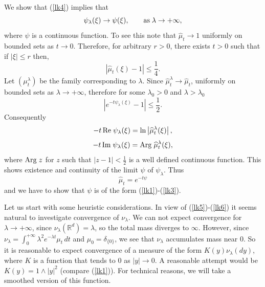 \documentclass[preprint]{imsart}
\def\R{\mathbb R}
\begin{document}
{\noindent We show that (\ref{lk4}) implies that
\begin{equation}\label{lk6}
\psi_\lambda (\xi)\to \psi(\xi),\qquad
{\rm as}\; \lambda\to +\infty,
\end{equation}
where $\psi$ is a continuous function. To see this note
that $\widehat{\mu}_t\to 1$ uniformly on bounded sets
as $t\to 0$. Therefore, for arbitrary $r>0$, there
exists $t>0$ such that if $|\xi|\leq r$ then,
$$
\left| \widehat{\mu}_t(\xi)-1\right|
\leq \frac{1}{4}.
$$
Let $(\mu_t^\lambda)$ be the family corresponding to
$\lambda$. Since
$\widehat{\mu}_t^\lambda\to\widehat{\mu}_t$, uniformly
on bounded sets as $\lambda\to +\infty$,  therefore for
some $\lambda_0>0$ and $\lambda >\lambda_0$
$$
\left| e^{-t\psi_\lambda(\xi)}-1\right|
\leq \frac{1}{2}.
$$
Consequently
$$
-t \, {\rm Re\;}\psi_\lambda(\xi)=\ln
\left|\widehat{\mu}_t^\lambda(\xi)\right|,
$$
$$
-t\,  {\rm Im\;}\psi_\lambda(\xi)=
{\rm Arg\;}\widehat{\mu}_t^\lambda(\xi) ,
$$
where ${\rm Arg\;}z$ for $z$ such that
$|z-1|<\frac{1}{2}$ is a well defined continuous
function. This shows existence and continuity of the
limit $\psi$ of $\psi_\lambda$. Thus
$$
\widehat{\mu}_t=e^{-t\psi}
$$
and we have to show that $\psi$ is of the form
(\ref{lk1})-(\ref{lk3}).

\noindent Let us start with some heuristic considerations. In
view of (\ref{lk5})-(\ref{lk6}) it seems natural to
investigate convergence of $\nu_\lambda$.
We can not expect convergence for $\lambda\to +\infty$,
since $\nu_\lambda (\R^d)=\lambda$, so the
total mass diverges to $\infty$. However, since
$\nu_\lambda =
\int_0^{+\infty}\lambda^2 e^{-\lambda t}\mu_t\, dt$
and $\mu_0=\delta_{\{0\}}$, we see that
$\nu_\lambda $ accumulates mass near $0$.
So it is reasonable to expect convergence of a measure
of the form $K(y)\nu_\lambda (dy)$, where
$K$ is a function that tends to $0$ as $|y|\to 0$. A
reasonable attempt would be $K(y)=1\wedge |y|^2$
(compare (\ref{lk1})). For technical reasons, we will
take a smoothed version of this function.

}
\end{document}
